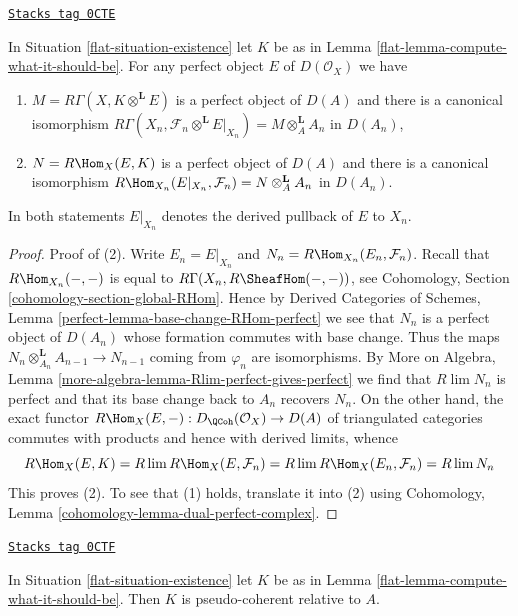 \begin{lemma}
\label{flat-lemma-compute-against-perfect}
\href{https://stacks.math.columbia.edu/tag/0CTE}{\texttt{Stacks tag 0CTE}}

In Situation \ref{flat-situation-existence} let $K$ be as in
Lemma \ref{flat-lemma-compute-what-it-should-be}. For any perfect
object $E$ of $D(\mathcal{O}_X)$ we have
\begin{enumerate}
\item $M = R\Gamma(X, K \otimes^\mathbf{L} E)$ is a perfect object of $D(A)$
and there is a canonical isomorphism
$R\Gamma(X_n, \mathcal{F}_n \otimes^\mathbf{L} E|_{X_n}) =
M \otimes_A^\mathbf{L} A_n$
in $D(A_n)$,
\item $N = R\Hom_X(E, K)$ is a perfect object of $D(A)$
and there is a canonical isomorphism
$R\Hom_{X_n}(E|_{X_n}, \mathcal{F}_n) = N \otimes_A^\mathbf{L} A_n$
in $D(A_n)$.
\end{enumerate}
In both statements $E|_{X_n}$ denotes the derived pullback
of $E$ to $X_n$.
\end{lemma}

\begin{proof}
Proof of (2). Write $E_n = E|_{X_n}$ and
$N_n = R\Hom_{X_n}(E_n, \mathcal{F}_n)$.
Recall that $R\Hom_{X_n}(-, -)$ is equal to
$R\Gamma(X_n, R\SheafHom(-, -))$, see
Cohomology, Section \ref{cohomology-section-global-RHom}.
Hence by Derived Categories of Schemes, Lemma
\ref{perfect-lemma-base-change-RHom-perfect}
we see that $N_n$ is a perfect object of $D(A_n)$
whose formation commutes with base change. Thus the maps
$N_n \otimes_{A_n}^\mathbf{L} A_{n - 1} \to N_{n - 1}$
coming from $\varphi_n$ are isomorphisms.
By More on Algebra, Lemma \ref{more-algebra-lemma-Rlim-perfect-gives-perfect}
we find that $R\lim N_n$ is perfect and
that its base change back to $A_n$ recovers $N_n$.
On the other hand, the exact functor
$R\Hom_X(E, -) : D_\QCoh(\mathcal{O}_X) \to D(A)$
of triangulated categories commutes with products
and hence with derived limits, whence
$$
R\Hom_X(E, K) =
R\lim R\Hom_X(E, \mathcal{F}_n) =
R\lim R\Hom_X(E_n, \mathcal{F}_n) =
R\lim N_n
$$
This proves (2). To see that (1) holds, translate it into (2)
using Cohomology, Lemma \ref{cohomology-lemma-dual-perfect-complex}.
\end{proof}

\begin{lemma}
\label{flat-lemma-relative-pseudo-coherence}
\href{https://stacks.math.columbia.edu/tag/0CTF}{\texttt{Stacks tag 0CTF}}

In Situation \ref{flat-situation-existence} let $K$ be as in
Lemma \ref{flat-lemma-compute-what-it-should-be}. Then $K$
is pseudo-coherent relative to $A$.
\end{lemma}

